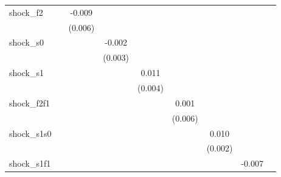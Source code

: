 {\begin{tabular}{l*{8}{c}}
\addlinespace
shock\_f2    &                     &      -0.009         &                     &                     &                     &                     &                     &                     \\
            &                     &     (0.006)         &                     &                     &                     &                     &                     &                     \\
\addlinespace
shock\_s0    &                     &                     &      -0.002         &                     &                     &                     &                     &                     \\
            &                     &                     &     (0.003)         &                     &                     &                     &                     &                     \\
\addlinespace
shock\_s1    &                     &                     &                     &       0.011\sym{**} &                     &                     &                     &                     \\
            &                     &                     &                     &     (0.004)         &                     &                     &                     &                     \\
\addlinespace
shock\_f2f1  &                     &                     &                     &                     &       0.001         &                     &                     &                     \\
            &                     &                     &                     &                     &     (0.006)         &                     &                     &                     \\
\addlinespace
shock\_s1s0  &                     &                     &                     &                     &                     &       0.010\sym{***}&                     &                     \\
            &                     &                     &                     &                     &                     &     (0.002)         &                     &                     \\
\addlinespace
shock\_s1f1  &                     &                     &                     &                     &                     &                     &      -0.007         &                     \\

\end{tabular}}
